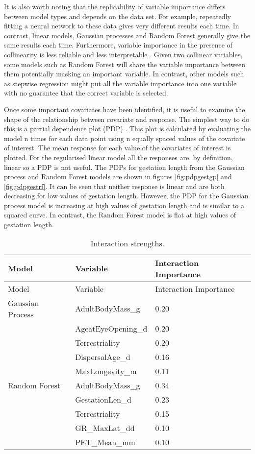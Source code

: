 \documentclass[10pt,]{article}
\begin{document}
It is also worth noting that the replicability of variable importance differs between model types and depends on the data set.
For example, repeatedly fitting a neural network to these data gives very different results each time.
In contrast, linear models, Gaussian processes and Random Forest generally give the same results each time.
Furthermore, variable importance in the presence of collinearity is less reliable and less interpretable \citep{dormann2013collinearity}.
Given two collinear variables, some models such as Random Forest will share the variable importance between them potentially masking an important variable.
In contrast, other models such as stepwise regression might put all the variable importance into one variable with no guarantee that the correct variable is selected.

Once some important covariates have been identified, it is useful to examine the shape of the relationship between covariate and response.
The simplest way to do this is a partial dependence plot (PDP) \citep{friedman2001greedy}.
This plot is calculated by evaluating the model n times for each data point using n equally spaced values of the covariate of interest.
The mean response for each value of the covariates of interest is plotted.
For the regularised linear model all the responses are, by definition, linear so a PDP is not useful.
The PDPs for gestation length from the Gaussian process and Random Forest models are shown in figures \ref{fig:pdpgestgp} and \ref{fig:pdpgestrf}.
It can be seen that neither response is linear and are both decreasing for low values of gestation length.
However, the PDP for the Gaussian process model is increasing at high values of gestation length and is similar to a squared curve.
In contrast, the Random Forest model is flat at high values of gestation length.

\begin{table}[t!]
\begin{longtable}[c]{@{}lll@{}}
\caption{Interaction strengths. \label{tbl:interimp}}\tabularnewline
\toprule
Model & Variable & Interaction Importance\tabularnewline
\midrule
\endfirsthead
\toprule
Model & Variable & Interaction Importance\tabularnewline
\midrule
\endhead
Gaussian Process & AdultBodyMass\_g & 0.20\tabularnewline
& AgeatEyeOpening\_d & 0.20\tabularnewline
& Terrestriality & 0.20\tabularnewline
& DispersalAge\_d & 0.16\tabularnewline
& MaxLongevity\_m & 0.11\tabularnewline
Random Forest & AdultBodyMass\_g & 0.34\tabularnewline
& GestationLen\_d & 0.23\tabularnewline
& Terrestriality & 0.15\tabularnewline
& GR\_MaxLat\_dd & 0.10\tabularnewline
& PET\_Mean\_mm & 0.10\tabularnewline
\bottomrule
\end{longtable}
\end{table}
\end{document}
